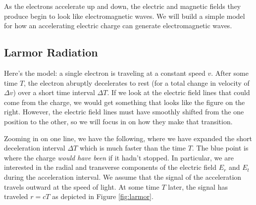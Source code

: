 As the electrons accelerate up and down, the electric and magnetic fields they produce begin to look like electromagnetic waves. We will build a simple model for how an accelerating electric charge can generate electromagnetic waves.
\subsection{Larmor Radiation}
Here's the model: a single electron is traveling at a constant speed $v$. After some time $T$, the electron abruptly decelerates to rest (for a total change in velocity of $\Delta v$) over a short time interval $\Delta T$. If we look at the electric field lines that could come from the charge, we would get something that looks like the figure on the right. However, the electric field lines must have smoothly shifted from the one position to the other, so we will focus in on how they make that transition.

\begin{marginfigure}\centering
{}
\end{marginfigure}

Zooming in on one line, we have the following, where we have expanded the short deceleration interval $\Delta T$ which is much faster than the time $T$.  The blue point is where the charge {\em would have been} if it hadn't stopped. In particular, we are interested in the radial and transverse components of the electric field $E_r$ and $E_t$ during the acceleration interval. We assume that the signal of the acceleration travels outward at the speed of light. At some time $T$ later, the signal has traveled $r=cT$ as depicted in Figure \ref{fig:larmor}.

